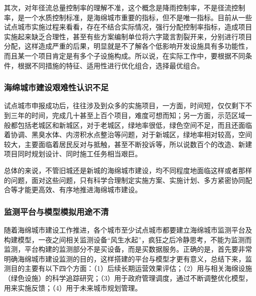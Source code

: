 \documentclass[
]{book}
\begin{document}
其次，对年径流总量控制率的理解不准，这个概念是降雨控制率，不是径流控制率，是一个水质控制标准，是海绵城市重要的指标，但不是唯一指标。目前从一些试点城市实施过程来看看，存在不结合实际情况，强行分配控制率指标，造成项目实施起来缺乏合理性，甚至有些方案编制单位将六字箴言割裂开来，分别进行项目分配，这样造成严重的后果，明显就是不了解各个低影响开发设施具有多功能性，而且某一个项目肯定是有多个子设施构成。所以说，在实际工作中，要根据不同条件，根据不同措施的特征、适用性进行优化组合，选择最优组合。

\hypertarget{ux6d77ux7ef5ux57ceux5e02ux5efaux8bbeux8270ux96beux6027ux8ba4ux8bc6ux4e0dux8db3}{%
\subsubsection{海绵城市建设艰难性认识不足}\label{ux6d77ux7ef5ux57ceux5e02ux5efaux8bbeux8270ux96beux6027ux8ba4ux8bc6ux4e0dux8db3}}

试点城市申报成功后，往往涉及到众多的实施项目，一方面，时间短，仅仅剩下不到三年的时间，完成几十甚至上百个项目，难度可想而知；另一方面，示范区域一般都包括老城区和新城区，对于老城区，绿地率很低，绿色空间不足，而且还面临着协调、黑臭水体、内涝积水点整治等问题，对于新城区，绿地率相对较高，空间较大，主要面临着居民反对与抵触，甚至不断投诉等，所以说数百个的改造、新建项目同时规划设计、同时施工任务相当艰巨。

总体的来说，不管旧城还是新城的海绵城市建设，均不同程度地面临这样或者那样的问题，面对这些问题，只有科学合理制定实施方案、实施计划、多方紧密协同配合等才能更高效、有序地推进海绵城市建设。

\hypertarget{ux76d1ux6d4bux5e73ux53f0ux4e0eux6a21ux578bux6a21ux62dfux7528ux9014ux4e0dux6e05}{%
\subsubsection{监测平台与模型模拟用途不清}\label{ux76d1ux6d4bux5e73ux53f0ux4e0eux6a21ux578bux6a21ux62dfux7528ux9014ux4e0dux6e05}}

随着海绵城市建设工作推进，各个城市至少试点城市都要建立海绵城市监测平台及构建模型，一夜之间相关监测设备``风生水起''，疯狂之后冷静思考，不能为监测而监测，平台构建的监测部分不是买设备，而是买数据服务。正确的是，首先要非常明确海绵城市建设监测的目的，这样搭建的平台与模型才更有意义，总结下来，监测目的主要有以下四个方面：（1）后续长期运营效果评估；（2）用与相关海绵设施（绿色设施）的科学追踪研究；（3）用于政府管理调度，通过不断调整优化模型，用来实施反馈；（4）用于未来城市规划管理。
\end{document}
